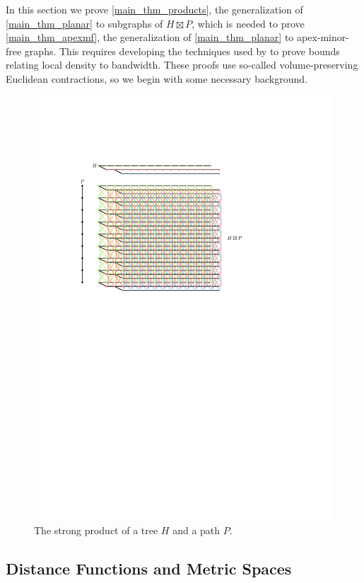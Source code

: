 \documentclass{patmorin}
\begin{document}
In this section we prove \cref{main_thm_products}, the generalization of \cref{main_thm_planar} to subgraphs of $H\boxtimes P$, which is needed to prove \cref{main_thm_apexmf}, the generalization of \cref{main_thm_planar} to apex-minor-free graphs.  This requires developing the techniques used by \citet{feige:approximating,rao:small} to prove bounds relating local density to bandwidth. These proofs use so-called volume-preserving Euclidean contractions, so we begin with some necessary background.

\begin{figure}
  \centering
  \includegraphics[page=1]{figs/product}
  \caption{The strong product of a tree $H$ and a path $P$.}
  \label{strong_product_fig}
\end{figure}


\subsection{Distance Functions and Metric Spaces}
\end{document}
